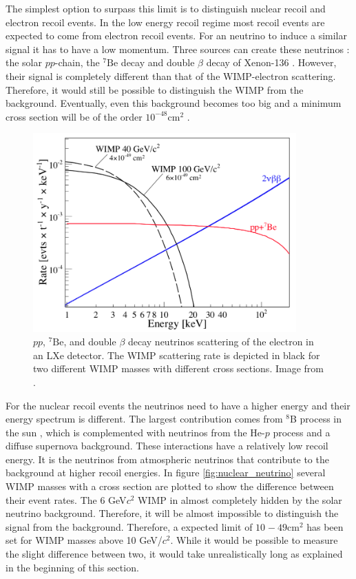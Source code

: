 \documentclass{article}
\begin{document}
The simplest option to surpass this limit is to distinguish nuclear recoil and electron recoil events. In the low energy recoil regime most recoil events are expected to come from electron recoil events. For an neutrino to induce a similar signal it has to have a low momentum. Three sources can create these neutrinos \cite{Baudis:2013qla}: the solar $pp$-chain, the ${}^7\text{Be}$ decay and double $\beta$ decay of Xenon-136 \cite{Albert:2015eem}. However, their signal is completely different than that of the WIMP-electron scattering. Therefore, it would still be possible to distinguish the WIMP from the background. Eventually, even this background becomes too big and a minimum cross section will be of the order $10^{-48}$cm$^2$ \cite{Schumann:2015cpa}.

\begin{figure}[h!]
    \centering
    \includegraphics[width=0.9\textwidth]{Electron_neutrino.png}
    \caption{$pp$, ${}^7\text{Be}$, and double $\beta$ decay neutrinos scattering of the electron in an LXe detector. The WIMP scattering rate is depicted in black for two different WIMP masses with different cross sections. Image from \cite{Baudis:2013qla}.}
    \label{fig:electron_neutrino}
\end{figure}


For the nuclear recoil events the neutrinos need to have a higher energy and their energy spectrum is different. The largest contribution comes from $^8$B process in the sun \cite{Strigari:2009bq}, which is complemented with neutrinos from the He-$p$ process and a diffuse supernova background. These interactions have a relatively low recoil energy. It is the neutrinos from atmospheric neutrinos that contribute to the background at higher recoil energies. In figure \ref{fig:nuclear_neutrino} several WIMP masses with a cross section are plotted to show the difference between their event rates. The 6 GeV$c^2$ WIMP in almost completely hidden by the solar neutrino background. Therefore, it will be almost impossible to distinguish the signal from the background. Therefore, a expected limit of $10^{}-49$cm$^2$ has been set for WIMP masses above 10 GeV/$c^2$. While it would be possible to measure the slight difference between two, it would take unrealistically long as explained in the beginning of this section. 
\end{document}
